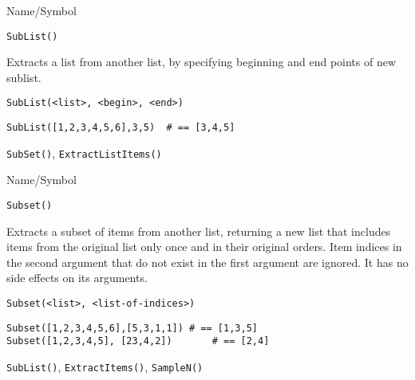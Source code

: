 \rl


\begin{desc}{Name/Symbol}
\item[Name/Symbol]  	\verb+SubList()+

\item[Description] 	Extracts a list from another list, by specifying 
	     	beginning and end points of new sublist.

\item[Usage]
\begin{verbatim}
SubList(<list>, <begin>, <end>)
\end{verbatim}

\item[Example]     	
\begin{verbatim}
SubList([1,2,3,4,5,6],3,5)	# == [3,4,5]
\end{verbatim}

\item[See Also]    	\verb+SubSet()+, \verb+ExtractListItems()+
\end{desc}

\rl


\begin{desc}{Name/Symbol}
\item[Name/Symbol]  	\verb+Subset()+

\item[Description] Extracts a subset of items from another list,
  returning a new list that includes items from the original list only
  once and in their original orders.  Item indices in the second
  argument that do not exist in the first argument are ignored.  It
  has no side effects on its arguments.  

\item[Usage]       	
\begin{verbatim}
Subset(<list>, <list-of-indices>)
\end{verbatim}

\item[Example]     	
\begin{verbatim}
Subset([1,2,3,4,5,6],[5,3,1,1])	# == [1,3,5]
Subset([1,2,3,4,5], [23,4,2])		# == [2,4]
\end{verbatim}

\item[See Also]   	\verb+SubList()+, \verb+ExtractItems()+, \verb+SampleN()+
\end{desc}

\rl


